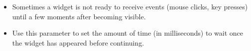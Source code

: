 \begin{itemize}
\item Sometimes a widget is not ready to receive events (mouse clicks, key presses) until a few moments after becoming visible.
\item Use this parameter to set the amount of time (in milliseconds) to wait once the widget has appeared before continuing.
\end{itemize}

